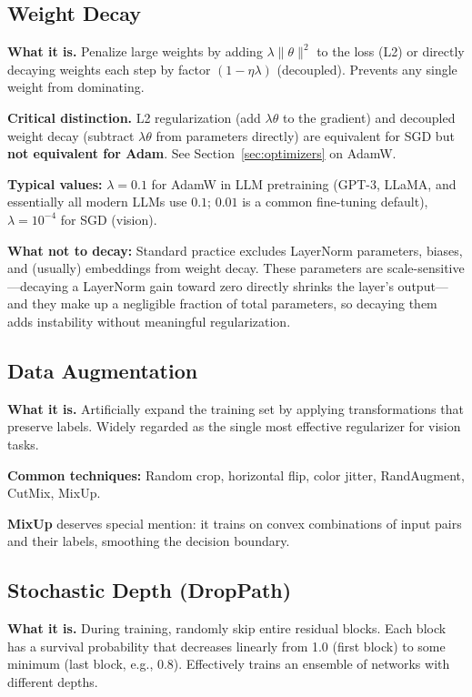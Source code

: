 \subsection{Weight Decay}

\textbf{What it is.} Penalize large weights by adding $\lambda\|\theta\|^2$ to the loss (L2) or directly decaying weights each step by factor $(1 - \eta\lambda)$ (decoupled). Prevents any single weight from dominating.

\textbf{Critical distinction.} L2 regularization (add $\lambda\theta$ to the gradient) and decoupled weight decay (subtract $\lambda\theta$ from parameters directly) are equivalent for SGD but \textbf{not equivalent for Adam}. See Section~\ref{sec:optimizers} on AdamW.

\textbf{Typical values:} $\lambda = 0.1$ for AdamW in LLM pretraining (GPT-3, LLaMA, and essentially all modern LLMs use $0.1$; $0.01$ is a common fine-tuning default), $\lambda = 10^{-4}$ for SGD (vision).

\textbf{What not to decay:} Standard practice excludes LayerNorm parameters, biases, and (usually) embeddings from weight decay. These parameters are scale-sensitive---decaying a LayerNorm gain toward zero directly shrinks the layer's output---and they make up a negligible fraction of total parameters, so decaying them adds instability without meaningful regularization.

\subsection{Data Augmentation}

\textbf{What it is.} Artificially expand the training set by applying transformations that preserve labels. Widely regarded as the single most effective regularizer for vision tasks.

\textbf{Common techniques:} Random crop, horizontal flip, color jitter, RandAugment, CutMix, MixUp.

\textbf{MixUp} deserves special mention: it trains on convex combinations of input pairs and their labels, smoothing the decision boundary.

\subsection{Stochastic Depth (DropPath)}

\textbf{What it is.} During training, randomly skip entire residual blocks. Each block has a survival probability that decreases linearly from 1.0 (first block) to some minimum (last block, e.g., 0.8). Effectively trains an ensemble of networks with different depths.

